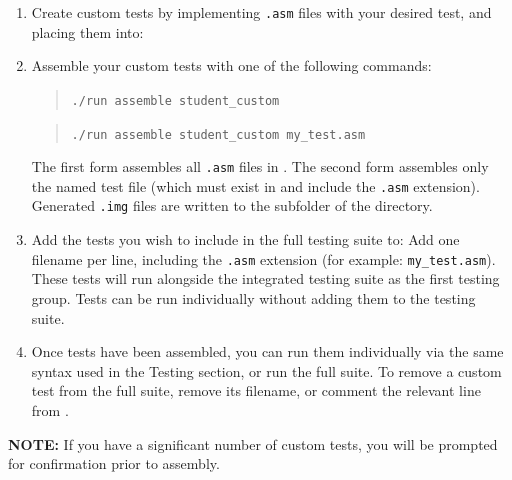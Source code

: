 \documentclass[12pt]{article}
\begin{document}
\begin{enumerate}
\item Create custom tests by implementing \texttt{.asm} files with your desired test, and placing them into:

\item Assemble your custom tests with one of the following commands:
\begin{quote}
\texttt{./run assemble student\_custom}
\end{quote}
\begin{quote}
\texttt{./run assemble student\_custom my\_test.asm}
\end{quote}
The first form assembles all \texttt{.asm} files in . The second form assembles only the named test file (which must exist in  and include the \texttt{.asm} extension). Generated \texttt{.img} files are written to the  subfolder of the  directory.

\item Add the tests you wish to include in the full testing suite to:
Add one filename per line, including the \texttt{.asm} extension (for example: \texttt{my\_test.asm}). These tests will run alongside the integrated testing suite as the first testing group. Tests can be run individually without adding them to the testing suite.

\item Once tests have been assembled, you can run them individually via the same syntax used in the Testing section, or run the full suite. To remove a custom test from the full suite, remove its filename, or comment the relevant line from .
\end{enumerate}

\textbf{NOTE:} If you have a significant number of custom tests, you will be prompted for confirmation prior to assembly.
\end{document}
